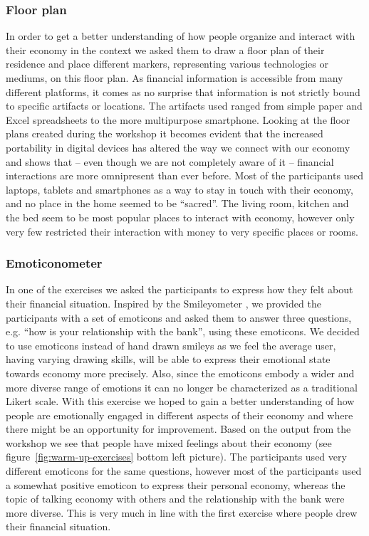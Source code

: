 \subsubsection*{Floor plan}
In order to get a better understanding of how people organize and interact with their economy in the context we asked them to draw a floor plan of their residence and place different markers, representing various technologies or mediums, on this floor plan.
As financial information is accessible from many different platforms, it comes as no surprise that information is not strictly bound to specific artifacts or locations. The artifacts used ranged from simple paper and Excel spreadsheets to the more multipurpose smartphone. Looking at the floor plans created during the workshop it becomes evident that the increased portability in digital devices has altered the way we connect with our economy and shows that – even though we are not completely aware of it – financial interactions are more omnipresent than ever before. Most of the participants used laptops, tablets and smartphones as a way to stay in touch with their economy, and no place in the home seemed to be “sacred”. The living room, kitchen and the bed seem to be most popular places to interact with economy, however only very few restricted their interaction with money to very specific places or rooms.

\subsubsection*{Emoticonometer}
In one of the exercises we asked the participants to express how they felt about their financial situation. Inspired by the Smileyometer \cite{read2006using}, we provided the participants with a set of emoticons and asked them to answer three questions, e.g. “how is your relationship with the bank”, using these emoticons. We decided to use emoticons instead of hand drawn smileys as we feel the average user, having varying drawing skills, will be able to express their emotional state towards economy more precisely. Also, since the emoticons embody a wider and more diverse range of emotions it can no longer be characterized as a traditional Likert scale. With this exercise we hoped to gain a better understanding of how people are emotionally engaged in different aspects of their economy and where there might be an opportunity for improvement. Based on the output from the workshop we see that people have mixed feelings about their economy (see figure~\ref{fig:warm-up-exercises} bottom left picture). The participants used very different emoticons for the same questions, however most of the participants used a somewhat positive emoticon to express their personal economy, whereas the topic of talking economy with others and the relationship with the bank were more diverse. This is very much in line with the first exercise where people drew their financial situation.
